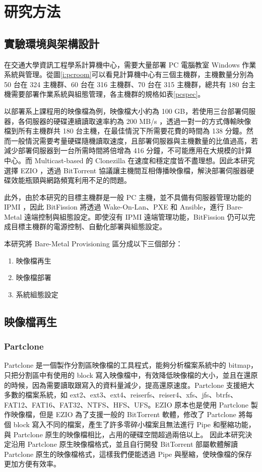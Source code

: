 \chapter{研究方法}
\section{實驗環境與架構設計}



在交通大學資訊工程學系計算機中心，需要大量部署 PC 電腦教室 Windows 作業系統與管理。從圖\ref{i:pcroom}可以看見計算機中心有三個主機群，主機數量分別為 50 台在 324 主機群、60 台在 316 主機群、70 台在 315 主機群，總共有 180 台主機需要部署作業系統與組態管理，各主機群的規格如表\ref{pcspec}。





以部署系上課程用的映像檔為例，映像檔大小約為 100 GB，若使用三台部署伺服器，各伺服器的硬碟連續讀取速率約為 200 MB/s ，透過一對一的方式傳輸映像檔到所有主機群共 180 台主機，在最佳情況下所需要花費的時間為 138 分鐘。然而一般情況需要考量硬碟隨機讀取速度，且部署伺服器與主機數量的比值過高，若減少部署伺服器到一台所需時間將倍增為 416 分鐘，不可能應用在大規模的計算中心。而 Multicast-based 的 Clonezilla 在速度和穩定度皆不盡理想。因此本研究選擇 EZIO ，透過 BitTorrent 協議讓主機間互相傳播映像檔，解決部署伺服器硬碟效能瓶頸與網路頻寬利用不足的問題。


此外，由於本研究的目標主機群是一般 PC 主機，並不具備有伺服器管理功能的 IPMI ，因此 BitFission 將透過 Wake-On-Lan、PXE 和 Ansible，進行 Bare-Metal 遠端控制與組態設定。即使沒有 IPMI 遠端管理功能，BitFission 仍可以完成目標主機群的電源控制、自動化部署與組態設定。


本研究將 Bare-Metal Provisioning 區分成以下三個部分：

\begin{enumerate}
\item 映像檔再生
\item 映像檔部署
\item 系統組態設定
\end{enumerate}


\section{映像檔再生}
\subsection{Partclone}
Partclone 是一個製作分割區映像檔的工具程式，能夠分析檔案系統中的 bitmap，只把分割區中有使用的 block 寫入映像檔中，有效降低映像檔的大小，並且在還原的時候，因為需要讀取跟寫入的資料量減少，提高還原速度。Partclone 支援絕大多數的檔案系統，如 ext2、ext3、ext4、reiserfs、reiser4、xfs、jfs、btrfs、FAT12、FAT16、FAT32、NTFS、HFS、UFS。EZIO 原本也是使用 Partclone 製作映像檔，但是 EZIO 為了支援一般的 BitTorrent 軟體，修改了 Partclone 將每個 block 寫入不同的檔案，產生了許多零碎小檔案且無法進行 Pipe 和壓縮功能，與 Partclone 原生的映像檔相比，占用的硬碟空間超過兩倍以上。
因此本研究決定沿用 Partclone 原生映像檔格式，並且自行開發 BitTorrent 部屬軟體解讀 Partclone 原生的映像檔格式，這樣我們便能透過 Pipe 與壓縮，使映像檔的保存更加方便有效率。


